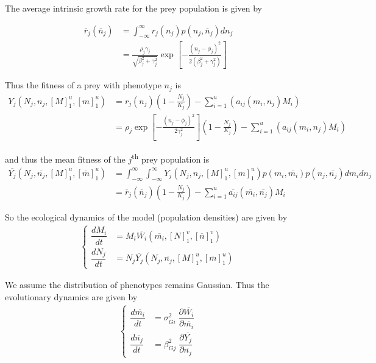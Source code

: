\documentclass[12pt]{article}
\begin{document}
\noindent The average intrinsic growth rate for the prey population is given by

\begin{align*}
	\overline{r}_j(\overline{n}_j) &= \int_{-\infty}^\infty{r_j(n_j)p(n_j, \overline{n}_j)}dn_j \\
	&= \frac{\rho_j\gamma_j}{\sqrt{\beta_j^2 + \gamma_j^2}}\exp\left[{-\frac{(n_j - \phi_j)^2}{2(\beta_j^2 + \gamma_j^2)}}\right]
\end{align*}

\noindent Thus the fitness of a prey with phenotype $n_j$ is
\begin{align*}
	Y_j(N_j, n_j, [M]_1^u, [m]_1^u) &= r_j(n_j)\left(1 - \frac{N_j}{K_j} \right) - \sum_{i = 1}^u\left(a_{ij}(m_i, n_j)M_i\right) \\
	&= \rho_j\exp{\left[-\frac{(n_j - \phi_j)^2}{2\gamma_j^2}\right]}\left(1 - \frac{N_j}{K_j}\right) - \sum_{i = 1}^u\left(a_{ij}(m_i, n_j)M_i\right)
\end{align*}

\noindent and thus the mean fitness of the $j$\textsuperscript{th} prey population is
\begin{align*}
	\overline{Y_j}(N_j, \overline{n_j}, [M]_1^u, [\overline{m}]_1^u) &= \int_{-\infty}^{\infty}\int_{-\infty}^{\infty} Y_j(N_j, n_j, [M]_1^u, [m]_1^u) p(m_i, \overline{m_i}) p(n_j, \overline{n_j}) dm_i dn_j \\
	&= \overline{r}_j(\overline{n}_j) \left(1 - \frac{N_j}{K_j} \right) - \sum_{i = 1}^u \overline{a_{ij}}(\overline{m_i}, \overline{n_j}) M_i
\end{align*}

\noindent So the ecological dynamics of the model (population densities) are given by
\begin{align}
	\begin{cases}
		\dfrac{dM_i}{dt} &= M_i \overline{W_i}(\overline{m_i}, [N]_1^v, [\overline{n}]_1^v) \\[.25cm]
		\dfrac{dN_j}{dt} &= N_j \overline{Y_j}(N_j, \overline{n_j}, [M]_1^u, [\overline{m}]_1^u)
	\end{cases}
\end{align}

\noindent We assume the distribution of phenotypes remains Gaussian.  Thus the evolutionary dynamics are given by
\begin{align}
	\begin{cases}
		\dfrac{d\overline{m_i}}{dt} &= \sigma_{Gi}^2 \; \dfrac{\partial \overline{W_i}}{\partial \overline{m_i}} \\[.25cm]
		\dfrac{d\overline{n_j}}{dt} &= \beta_{Gj}^2 \; \dfrac{\partial \overline{Y_j}}{\partial \overline{n_j}}
	\end{cases}
\end{align}
\end{document}
